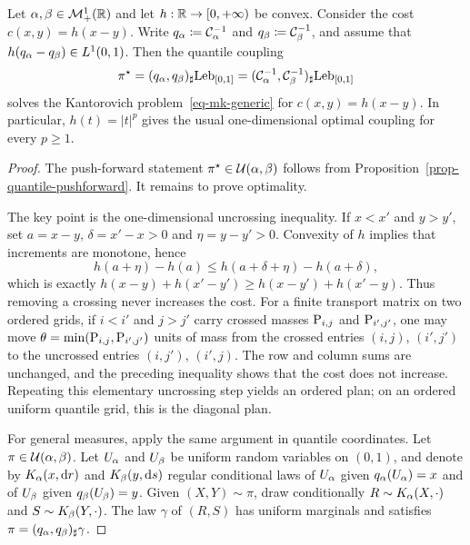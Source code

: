 \begin{thm}\label{prop-1d-kantorovich-quantile-coupling}
		Let $\al,\be\in\Mm_+^1(\RR)$ and let $h:\RR\to[0,+\infty)$ be convex. Consider the cost $c(x,y)=h(x-y)$. Write $q_\al\eqdef\cumul{\al}^{-1}$ and $q_\be\eqdef\cumul{\be}^{-1}$, and assume that $h(q_\al-q_\be)\in L^1(0,1)$. Then the quantile coupling
	\[
		\pi^\star=(q_\al,q_\be)_\sharp\mathrm{Leb}_{[0,1]}
		=
		(\cumul{\al}^{-1},\cumul{\be}^{-1})_\sharp\mathrm{Leb}_{[0,1]}
	\]
	solves the Kantorovich problem~\eqref{eq-mk-generic} for $c(x,y)=h(x-y)$.
	In particular, $h(t)=|t|^p$ gives the usual one-dimensional optimal coupling for every $p\geq1$.
\end{thm}
\begin{proof}
	The push-forward statement $\pi^\star\in\Couplings(\al,\be)$ follows from Proposition~\ref{prop-quantile-pushforward}. It remains to prove optimality.

	The key point is the one-dimensional uncrossing inequality. If $x<x'$ and $y>y'$, set $a=x-y$, $\delta=x'-x>0$ and $\eta=y-y'>0$. Convexity of $h$ implies that increments are monotone, hence
	\[
		h(a+\eta)-h(a)
		\leq
		h(a+\delta+\eta)-h(a+\delta),
	\]
	which is exactly
	\(h(x-y)+h(x'-y') \geq h(x-y')+h(x'-y)\).
	Thus removing a crossing never increases the cost. For a finite transport matrix on two ordered grids, if $i<i'$ and $j>j'$ carry crossed masses $\P_{i,j}$ and $\P_{i',j'}$, one may move $\theta=\min(\P_{i,j},\P_{i',j'})$ units of mass from the crossed entries $(i,j)$, $(i',j')$ to the uncrossed entries $(i,j')$, $(i',j)$. The row and column sums are unchanged, and the preceding inequality shows that the cost does not increase. Repeating this elementary uncrossing step yields an ordered plan; on an ordered uniform quantile grid, this is the diagonal plan.

		For general measures, apply the same argument in quantile coordinates. Let $\pi\in\Couplings(\al,\be)$. Let $U_\al$ and $U_\be$ be uniform random variables on $(0,1)$, and denote by $K_\al(x,\d r)$ and $K_\be(y,\d s)$ regular conditional laws of $U_\al$ given $q_\al(U_\al)=x$ and of $U_\be$ given $q_\be(U_\be)=y$. Given $(X,Y)\sim\pi$, draw conditionally $R\sim K_\al(X,\cdot)$ and $S\sim K_\be(Y,\cdot)$. The law $\gamma$ of $(R,S)$ has uniform marginals and satisfies $\pi=(q_\al,q_\be)_\sharp\gamma$.


\end{proof}
